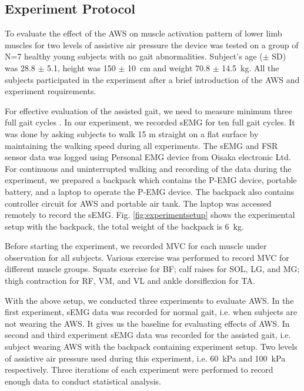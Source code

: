 \documentclass[letterpaper, 10 pt, conference]{ieeeconf}  %
\begin{document}
\subsection{Experiment Protocol}
To evaluate the effect of the AWS on muscle activation pattern of lower limb muscles for two levels of assistive air pressure the device was tested on a group of N=7 healthy young subjects with no gait abnormalities. Subject’s age ($\pm$ SD) was 28.8 $\pm$ 5.1, height was 150 $\pm$ \SI{10}{\centi\meter} and weight 70.8 $\pm$ \SI{14.5}{\kilogram}. All the subjects participated in the experiment after a brief introduction of the AWS and experiment requirements.

For effective evaluation of the assisted gait, we need to measure minimum three full gait cycles \cite{17}. In our experiment, we recorded sEMG for ten full gait cycles. It was done by asking subjects to walk 15 m straight on a flat surface by maintaining the walking speed during all experiments. The sEMG and FSR sensor data was logged using Personal EMG device from Oisaka electronic Ltd. For continuous and uninterrupted walking and recording of the data during the experiment, we prepared a backpack which contains the P-EMG device, portable battery, and a laptop to operate the P-EMG device. The backpack also contains controller circuit for AWS and portable air tank. The laptop was accessed remotely to record the sEMG. Fig. \ref{fig:experimentsetup} shows the experimental setup with the backpack, the total weight of the backpack is \SI{6}{\kilogram}. 

Before starting the experiment, we recorded MVC for each muscle under observation for all subjects. Various exercise was performed to record MVC for different muscle groups. Squats exercise for BF; calf raises for SOL, LG, and MG; thigh contraction for RF, VM, and VL and ankle dorsiflexion for TA. 

With the above setup, we conducted three experiments to evaluate AWS. In the first experiment, sEMG data was recorded for normal gait, i.e. when subjects are not wearing the AWS. It gives us the baseline for evaluating effects of AWS. In second and third experiment sEMG data was recorded for the assisted gait, i.e. subject wearing AWS with the backpack containing experiment setup. Two levels of assistive air pressure used during this experiment, i.e. \SI{60}{\kilo\pascal} and \SI{100}{\kilo\pascal} respectively. Three iterations of each experiment were performed to record enough data to conduct statistical analysis. 
\end{document}
